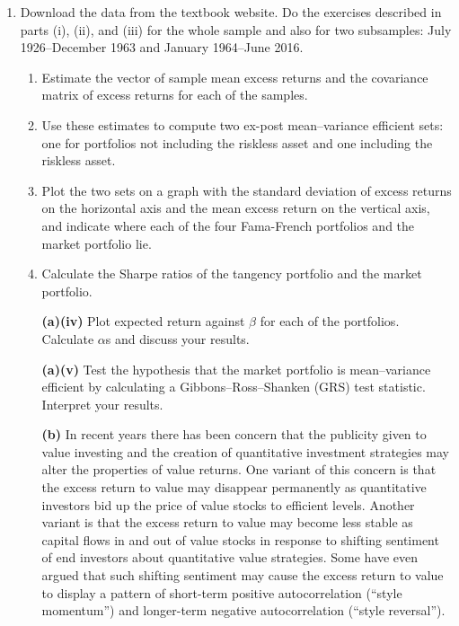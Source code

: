 \documentclass[12pt]{article}
\begin{document}
\begin{enumerate}[label=\textbf{(\alph*)}]
    \item Download the data from the textbook website. Do the exercises described in parts (i), (ii), and (iii) for the whole sample and also for two subsamples: July 1926–December 1963 and January 1964–June 2016.

    \begin{enumerate}[label=\textbf{(\roman*)}]
        \item Estimate the vector of sample mean excess returns and the covariance matrix of excess returns for each of the samples. 

        \item Use these estimates to compute two ex-post mean–variance efficient sets: one for portfolios not including the riskless asset and one including the riskless asset. 

        \item Plot the two sets on a graph with the standard deviation of excess returns on the horizontal axis and the mean excess return on the vertical axis, and indicate where each of the four Fama-French portfolios and the market portfolio lie. 

        \item Calculate the Sharpe ratios of the tangency portfolio and the market portfolio.

        \item[\textbf{(a)(iv)}] Plot expected return against $\beta$ for each of the portfolios. Calculate $\alpha$s and discuss your results.

    \item[\textbf{(a)(v)}] Test the hypothesis that the market portfolio is mean–variance efficient by calculating a Gibbons–Ross–Shanken (GRS) test statistic. Interpret your results.

    \item[\textbf{(b)}] In recent years there has been concern that the publicity given to value investing and the creation of quantitative investment strategies may alter the properties of value returns. One variant of this concern is that the excess return to value may disappear permanently as quantitative investors bid up the price of value stocks to efficient levels. Another variant is that the excess return to value may become less stable as capital flows in and out of value stocks in response to shifting sentiment of end investors about quantitative value strategies. Some have even argued that such shifting sentiment may cause the excess return to value to display a pattern of short-term positive autocorrelation (“style momentum”) and longer-term negative autocorrelation (“style reversal”).


\end{enumerate}
\end{enumerate}
\end{document}
